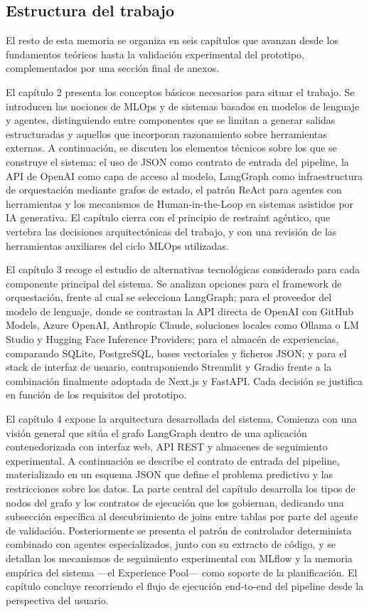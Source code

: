 \documentclass[12pt,a4paper]{article}
\theoremstyle{plain}
\begin{document}
\subsection{Estructura del trabajo}

El resto de esta memoria se organiza en seis capítulos que avanzan desde los fundamentos teóricos hasta la validación experimental del prototipo, complementados por una sección final de anexos.

El capítulo 2 presenta los conceptos básicos necesarios para situar el trabajo. Se introducen las nociones de MLOps y de sistemas basados en modelos de lenguaje y agentes, distinguiendo entre componentes que se limitan a generar salidas estructuradas y aquellos que incorporan razonamiento sobre herramientas externas. A continuación, se discuten los elementos técnicos sobre los que se construye el sistema: el uso de JSON como contrato de entrada del pipeline, la API de OpenAI como capa de acceso al modelo, LangGraph como infraestructura de orquestación mediante grafos de estado, el patrón ReAct para agentes con herramientas y los mecanismos de Human-in-the-Loop en sistemas asistidos por IA generativa. El capítulo cierra con el principio de restraint agéntico, que vertebra las decisiones arquitectónicas del trabajo, y con una revisión de las herramientas auxiliares del ciclo MLOps utilizadas.

El capítulo 3 recoge el estudio de alternativas tecnológicas considerado para cada componente principal del sistema. Se analizan opciones para el framework de orquestación, frente al cual se selecciona LangGraph; para el proveedor del modelo de lenguaje, donde se contrastan la API directa de OpenAI con GitHub Models, Azure OpenAI, Anthropic Claude, soluciones locales como Ollama o LM Studio y Hugging Face Inference Providers; para el almacén de experiencias, comparando SQLite, PostgreSQL, bases vectoriales y ficheros JSON; y para el stack de interfaz de usuario, contraponiendo Streamlit y Gradio frente a la combinación finalmente adoptada de Next.js y FastAPI. Cada decisión se justifica en función de los requisitos del prototipo.

El capítulo 4 expone la arquitectura desarrollada del sistema. Comienza con una visión general que sitúa el grafo LangGraph dentro de una aplicación contenedorizada con interfaz web, API REST y almacenes de seguimiento experimental. A continuación se describe el contrato de entrada del pipeline, materializado en un esquema JSON que define el problema predictivo y las restricciones sobre los datos. La parte central del capítulo desarrolla los tipos de nodos del grafo y los contratos de ejecución que los gobiernan, dedicando una subsección específica al descubrimiento de joins entre tablas por parte del agente de validación. Posteriormente se presenta el patrón de controlador determinista combinado con agentes especializados, junto con su extracto de código, y se detallan los mecanismos de seguimiento experimental con MLflow y la memoria empírica del sistema ---el Experience Pool--- como soporte de la planificación. El capítulo concluye recorriendo el flujo de ejecución end-to-end del pipeline desde la perspectiva del usuario.
\end{document}
